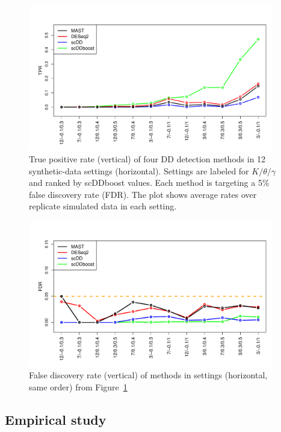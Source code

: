 \documentclass[aoas,preprint]{imsart}
\begin{document}
\begin{figure}[H]
  \includegraphics[width = 0.95\textwidth]{Figs/simuTPR.pdf}
  \caption{True positive rate (vertical) of four DD detection methods in 12 synthetic-data settings (horizontal). 
  Settings are labeled for $K / \theta / \gamma$  and ranked by scDDboost values. Each method
 is targeting a 5\% false discovery rate (FDR). The plot shows  average rates over replicate simulated data
 in each setting.
   }
  \label{fig:sim1}
\end{figure}


\begin{figure}[H]
  \includegraphics[width = 0.95\textwidth]{Figs/simuFDR.pdf}
  \caption{False discovery rate (vertical) of methods in settings (horizontal, same order) from Figure~\ref{fig:sim1} }
  \label{fig:sim2}
\end{figure}


\subsection{Empirical study}
\end{document}
